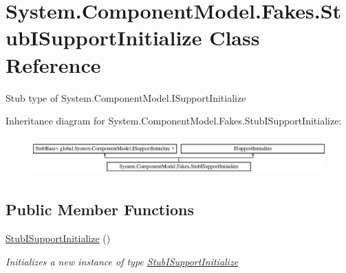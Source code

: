 \hypertarget{class_system_1_1_component_model_1_1_fakes_1_1_stub_i_support_initialize}{\section{System.\-Component\-Model.\-Fakes.\-Stub\-I\-Support\-Initialize Class Reference}
\label{class_system_1_1_component_model_1_1_fakes_1_1_stub_i_support_initialize}
}


Stub type of System.\-Component\-Model.\-I\-Support\-Initialize 


Inheritance diagram for System.\-Component\-Model.\-Fakes.\-Stub\-I\-Support\-Initialize\-:\begin{figure}[H]
\begin{center}
\leavevmode
\includegraphics[height=1.501341cm]{class_system_1_1_component_model_1_1_fakes_1_1_stub_i_support_initialize}
\end{center}
\end{figure}
\subsection*{Public Member Functions}
\begin{DoxyCompactItemize}
\item 
\hyperlink{class_system_1_1_component_model_1_1_fakes_1_1_stub_i_support_initialize_a9d74d5d85f59b432ca9c8b1fcaef3c56}{Stub\-I\-Support\-Initialize} ()
\begin{DoxyCompactList}\small\item\em Initializes a new instance of type \hyperlink{class_system_1_1_component_model_1_1_fakes_1_1_stub_i_support_initialize}{Stub\-I\-Support\-Initialize}\end{DoxyCompactList}\end{DoxyCompactItemize}
